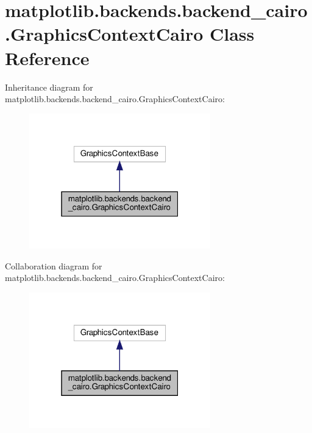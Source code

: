 \hypertarget{classmatplotlib_1_1backends_1_1backend__cairo_1_1GraphicsContextCairo}{}\section{matplotlib.\+backends.\+backend\+\_\+cairo.\+Graphics\+Context\+Cairo Class Reference}
\label{classmatplotlib_1_1backends_1_1backend__cairo_1_1GraphicsContextCairo}


Inheritance diagram for matplotlib.\+backends.\+backend\+\_\+cairo.\+Graphics\+Context\+Cairo\+:
\nopagebreak
\begin{figure}[H]
\begin{center}
\leavevmode
\includegraphics[width=223pt]{classmatplotlib_1_1backends_1_1backend__cairo_1_1GraphicsContextCairo__inherit__graph}
\end{center}
\end{figure}


Collaboration diagram for matplotlib.\+backends.\+backend\+\_\+cairo.\+Graphics\+Context\+Cairo\+:
\nopagebreak
\begin{figure}[H]
\begin{center}
\leavevmode
\includegraphics[width=223pt]{classmatplotlib_1_1backends_1_1backend__cairo_1_1GraphicsContextCairo__coll__graph}
\end{center}
\end{figure}

